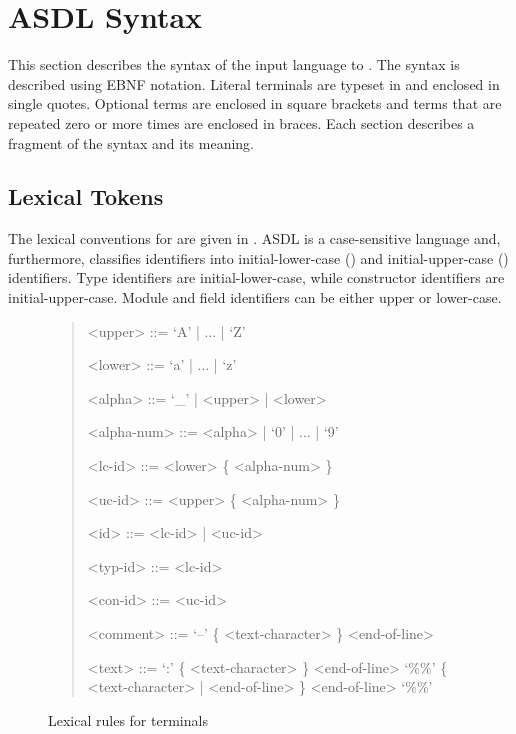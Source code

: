 %
\chapter{ASDL Syntax}
\label{chap:syntax}

This section describes the syntax of the input language to \asdlgen{}.
The syntax is described using EBNF notation.
Literal terminals are typeset in  and enclosed in single quotes.
Optional terms are enclosed in square brackets and terms that are
repeated zero or more times are enclosed in braces.
Each section describes a fragment of the syntax and its meaning.

\section{Lexical Tokens}

The lexical conventions for \asdl{} are given in .
ASDL is a case-sensitive language and, furthermore, classifies identifiers
into initial-lower-case () and initial-upper-case () identifiers.
Type identifiers are initial-lower-case, while constructor identifiers are initial-upper-case.
Module and field identifiers can be either upper or lower-case.

\begin{figure}[t]
  \begin{quote}
    \begin{grammar}
      <upper>     ::= `A' | ... | `Z'

      <lower>     ::= `a' | ... | `z'

      <alpha>     ::= `_' | <upper> | <lower>

      <alpha-num> ::= <alpha> | `0' | ... | `9'

      <lc-id>     ::= <lower> \{ <alpha-num> \}

      <uc-id>     ::= <upper> \{ <alpha-num> \}

      <id>        ::= <lc-id> | <uc-id>

      <typ-id>    ::= <lc-id>

      <con-id>    ::= <uc-id>

      <comment>   ::= `--' \{ <text-character> \} <end-of-line>

      <text>      ::= `:' \{ <text-character> \} <end-of-line>
               \alt{} `\%\%' \{ <text-character> | <end-of-line> \} <end-of-line> `\%\%'
    \end{grammar}
  \end{quote}
  \caption{Lexical rules for \asdl{} terminals}
  \label{fig:lexical-syntax}
\end{figure}%

